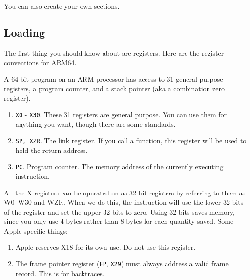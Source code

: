   You can also create your own sections. 

\subsection{Loading}

  The first thing you should know about are registers. Here are the register conventions for ARM64. 

  \begin{definition}
    A 64-bit program on an ARM processor has access to 31-general purpose registers, a program counter, and a stack pointer (aka a combination zero register). 
    \begin{enumerate}
      \item \texttt{X0} - \texttt{X30}. These 31 registers are general purpose. You can use them for anything you want, though there are some standards. 
      \item \texttt{SP, XZR}. The link register. If you call a function, this register will be used to hold the return address. 
      \item \texttt{PC}. Program counter. The memory address of the currently executing instruction. 
    \end{enumerate}
    All the X registers can be operated on as 32-bit registers by referring to them as W0–W30 and WZR. When we do this, the instruction will use the lower 32 bits of the register and set the upper 32 bits to zero. Using 32 bits saves memory, since you only use 4 bytes rather than 8 bytes for each quantity saved. 
    Some Apple specific things: 
    \begin{enumerate}
      \item Apple reserves X18 for its own use. Do not use this register. 
      \item The frame pointer register (\texttt{FP}, \texttt{X29}) must always address a valid frame record. This is for backtraces. 
    \end{enumerate}
  \end{definition}

